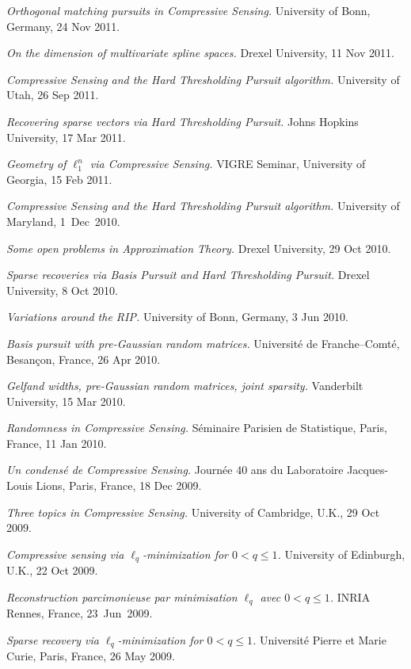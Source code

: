\documentclass[11pt]{article}
\begin{document}
\item {\sl Orthogonal matching pursuits in Compressive Sensing.} University of Bonn, Germany, 24 Nov 2011.
\item {\sl On the dimension of multivariate spline spaces.} Drexel University, 11 Nov 2011.
\item {\sl Compressive Sensing and the Hard Thresholding Pursuit algorithm.} University of Utah, 26 Sep 2011.
\item {\sl Recovering sparse vectors via Hard Thresholding Pursuit.} Johns Hopkins University, 17 Mar 2011.
\item {\sl Geometry of $\ell_1^n$ via Compressive Sensing.} VIGRE Seminar, University of Georgia, 15 Feb 2011.
\item {\sl Compressive Sensing and the Hard Thresholding Pursuit algorithm.\hspace{-1.5mm}}  University of Maryland, 1~Dec~2010.
\item {\sl Some open problems in Approximation Theory.} Drexel University, 29 Oct 2010.
\item {\sl Sparse recoveries via Basis Pursuit and Hard Thresholding Pursuit.} Drexel University, 8 Oct 2010.
\item {\sl Variations around the RIP.} University of Bonn, Germany, 3 Jun 2010.
\item {\sl Basis pursuit with pre-Gaussian random matrices.} 
Universit\'e de Franche--Comt\'e, Besan\c{c}on, France, 26 Apr 2010.
\item {\sl Gelfand widths, pre-Gaussian random matrices, joint sparsity.} Vanderbilt University, 15 Mar 2010.
\item {\sl Randomness in Compressive Sensing.} S\'eminaire Parisien de Statistique, Paris, France, 11 Jan 2010.
\item {\sl Un condens\'e de Compressive Sensing.} Journ\'ee 40 ans du Laboratoire Jacques-Louis Lions, Paris, France, 18 Dec 2009.
\item {\sl Three topics in Compressive Sensing.} University of Cambridge, U.K., 29 Oct 2009.
\item {\sl Compressive sensing via $\ell_q$-minimization for $0 < q \le 1$.} University of Edinburgh, U.K., 22 Oct 2009.
\item {\sl Reconstruction parcimonieuse par minimisation $\ell_q$ avec $0<q \le 1$.} INRIA Rennes, France, 23~Jun~2009.
\item {\sl Sparse recovery via $\ell_q$-minimization for $0<q \le 1$.} Universit\'e Pierre et Marie Curie, Paris, France, 26 May 2009.
\end{document}
